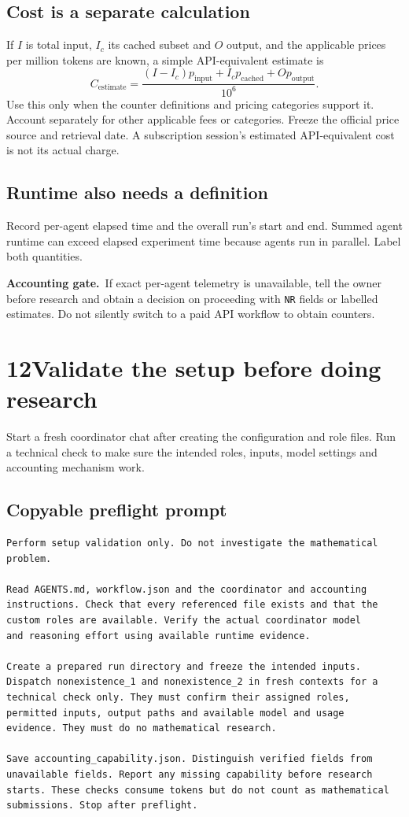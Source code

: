 \documentclass[11pt,a4paper]{article}
\newcommand{\step}[2]{\section*{#1\quad #2}}
\newcommand{\note}[2]{\par\smallskip\noindent\colorbox{paperblue}{\parbox{\dimexpr\linewidth-2\fboxsep\relax}{\textbf{#1}\ #2}}\par\smallskip}
\begin{document}
\subsection*{Cost is a separate calculation}
If $I$ is total input, $I_c$ its cached subset and $O$ output, and the applicable prices per million tokens are known, a simple API-equivalent estimate is
\[
C_{\mathrm{estimate}}=
\frac{(I-I_c)p_{\mathrm{input}}+I_c p_{\mathrm{cached}}+O p_{\mathrm{output}}}{10^6}.
\]
Use this only when the counter definitions and pricing categories support it. Account separately for other applicable fees or categories. Freeze the official price source and retrieval date. A subscription session's estimated API-equivalent cost is not its actual charge.

\subsection*{Runtime also needs a definition}
Record per-agent elapsed time and the overall run's start and end. Summed agent runtime can exceed elapsed experiment time because agents run in parallel. Label both quantities.

\note{Accounting gate.}{If exact per-agent telemetry is unavailable, tell the owner before research and obtain a decision on proceeding with \texttt{NR} fields or labelled estimates. Do not silently switch to a paid API workflow to obtain counters.}
\newpage

\step{12}{Validate the setup before doing research}
Start a fresh coordinator chat after creating the configuration and role files. Run a technical check to make sure the intended roles, inputs, model settings and accounting mechanism work.

\subsection*{Copyable preflight prompt}
\begin{lstlisting}
Perform setup validation only. Do not investigate the mathematical
problem.

Read AGENTS.md, workflow.json and the coordinator and accounting
instructions. Check that every referenced file exists and that the
custom roles are available. Verify the actual coordinator model
and reasoning effort using available runtime evidence.

Create a prepared run directory and freeze the intended inputs.
Dispatch nonexistence_1 and nonexistence_2 in fresh contexts for a
technical check only. They must confirm their assigned roles,
permitted inputs, output paths and available model and usage
evidence. They must do no mathematical research.

Save accounting_capability.json. Distinguish verified fields from
unavailable fields. Report any missing capability before research
starts. These checks consume tokens but do not count as mathematical
submissions. Stop after preflight.
\end{lstlisting}
\end{document}
